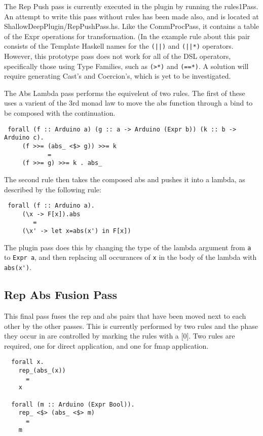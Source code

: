 \documentclass[11pt, oneside]{article}   	%
\begin{document}
The Rep Push pass is currently executed in the plugin by running the rules1Pass. 
An attempt to write this pass without rules has been made also, and is
located at ShallowDeepPlugin/RepPushPass.hs.  Like the CommProcPass,
it contains a table of the Expr operations for transformation.  (In the example 
rule about this pair consists of the Template Haskell names for the \verb+(||)+ and \verb+(||*)+
operators.  However, this prototype pass does not work for all of the DSL 
operators, specifically those using Type Families, such as \verb+(>*)+ and \verb+(==*)+.
A solution will require generating Cast's and Coercion's, which is yet to
be investigated.

The Abs Lambda pass performs the equivelent of two rules.  The first of these
uses a varient of the 3rd monad law to move the abs function through a bind
to be composed with the continuation.

\begin{verbatim}
 forall (f :: Arduino a) (g :: a -> Arduino (Expr b)) (k :: b -> Arduino c).
     (f >>= (abs_ <$> g)) >>= k
            =
     (f >>= g) >>= k . abs_
\end{verbatim}

The second rule then takes the composed abs and pushes it into a lambda, as
described by the following rule:

\begin{verbatim}
 forall (f :: Arduino a).
     (\x -> F[x]).abs
        =
     (\x' -> let x=abs(x') in F[x])
\end{verbatim}

The plugin pass does this by changing the type of the lambda argument from
\verb+a+ to \verb+Expr a+, and then replacing all occurances of \verb+x+
in the body of the lambda with \verb+abs(x')+.

\subsection{Rep Abs Fusion Pass}

This final pass fuses the rep and abs pairs that have been moved next
to each other by the other passes.  This is currently performed by
two rules and the phase they occur in are controlled by marking the rules
with a [0].  Two rules are required, one for direct application, and one for
fmap application.

\begin{verbatim}
  forall x.
    rep_(abs_(x))
      =
    x

  forall (m :: Arduino (Expr Bool)).
    rep_ <$> (abs_ <$> m)
      =
    m
\end{verbatim}
\end{document}
